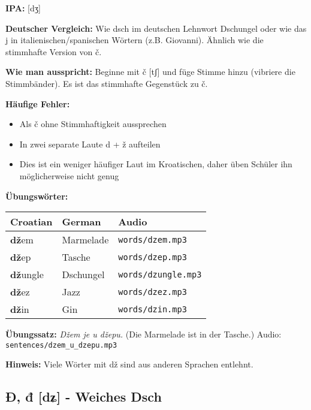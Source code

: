 \begin{tcolorbox}[colback=lightblue!30, colframe=croatianblue, title=\textbf{Dž, dž}]

\textbf{IPA:} [dʒ]

\textbf{Deutscher Vergleich:}
Wie \glqq dsch\grqq{} im deutschen Lehnwort \glqq Dschungel\grqq{} oder wie das \glqq j\grqq{} in italienischen/spanischen Wörtern (z.B. \glqq Giovanni\grqq{}). Ähnlich wie die stimmhafte Version von \glqq č\grqq{}.

\textbf{Wie man ausspricht:}
Beginne mit \glqq č\grqq{} [tʃ] und füge Stimme hinzu (vibriere die Stimmbänder). Es ist das stimmhafte Gegenstück zu \glqq č\grqq{}.

\textbf{Häufige Fehler:}
\begin{itemize}
    \item Als \glqq č\grqq{} ohne Stimmhaftigkeit aussprechen
    \item In zwei separate Laute \glqq d\grqq{} + \glqq ž\grqq{} aufteilen
    \item Dies ist ein weniger häufiger Laut im Kroatischen, daher üben Schüler ihn möglicherweise nicht genug
\end{itemize}

\textbf{Übungswörter:}
\begin{tabular}{lll}
\textbf{Croatian} & \textbf{German} & \textbf{Audio} \\
\midrule
\textbf{dž}em & Marmelade & \texttt{words/dzem.mp3} \\
\textbf{dž}ep & Tasche & \texttt{words/dzep.mp3} \\
\textbf{dž}ungle & Dschungel & \texttt{words/dzungle.mp3} \\
\textbf{dž}ez & Jazz & \texttt{words/dzez.mp3} \\
\textbf{dž}in & Gin & \texttt{words/dzin.mp3} \\
\end{tabular}

\textbf{Übungssatz:}
\textit{Džem je u džepu.}
(Die Marmelade ist in der Tasche.)
Audio: \texttt{sentences/dzem\_u\_dzepu.mp3}

\textbf{Hinweis:}
Viele Wörter mit \glqq dž\grqq{} sind aus anderen Sprachen entlehnt.

\end{tcolorbox}

\subsection{Đ, đ [dʑ] - \glqq Weiches Dsch\grqq{}}

